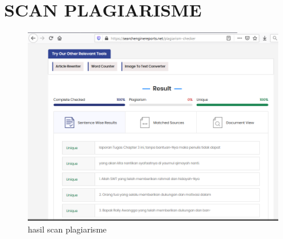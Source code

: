 \section{SCAN PLAGIARISME}
                \begin{figure}[H]
				\includegraphics[width=20cm]{figures/1184030/fungsi/plagiarisme.PNG}
				\centering
				\caption{hasil scan plagiarisme}
				\end{figure}